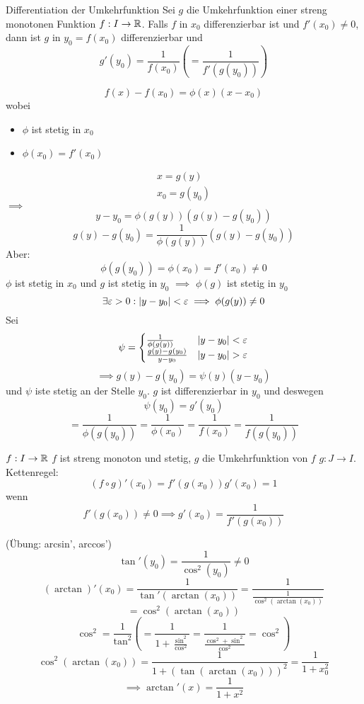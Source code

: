 \begin{Sat}{Differentiation der Umkehrfunktion}
  Sei $g$ die Umkehrfunktion einer streng monotonen Funktion $f:I\to\mathbb{R}$. Falls $f$ in $x_0$ differenzierbar ist und $f'(x_0)\neq 0$, dann ist $g$ in $y_0 = f(x_0)$ differenzierbar und
  \[g'(y_0)=\frac{1}{f(x_0)}\left( =\frac{1}{f'(g(y_0))} \right)\]
\end{Sat}
\begin{Bew}
  \[f(x)-f(x_0)=\phi(x)(x-x_0)\]
  wobei
  \begin{itemize}
    \item $\phi$ ist stetig in $x_0$
    \item $\phi(x_0) = f'(x_0)$
  \end{itemize}
  \begin{eqnarray*}
    x=g(y)\\
    x_0=g(y_0)
  \end{eqnarray*}
  $\implies$
  \[y-y_0=\phi(g(y))(g(y)-g(y_0))\]
  \[g(y)-g(y_0)=\frac{1}{\phi(g(y))}(g(y)-g(y_0))\]
  Aber:
  \[\phi(g(y_0))=\phi(x_0)=f'(x_0)\neq 0\]
  $\phi$ ist stetig in $x_0$ und $g$ ist stetig in $y_0$ $\implies$ $\phi(g)$ ist stetig in $y_0$
  \[\exists\varepsilon>0: \mathopen| y-y_0 \mathclose|<\varepsilon\implies \phi(g(y))\neq 0\]
  Sei
  \[\psi = \begin{cases}
    \frac{1}{\phi(g(y))}&\abs{y-y_0}<\varepsilon\\
    \frac{g(y)-g(y_0)}{y-y_0}&\abs{y-y_0}>\varepsilon
  \end{cases}\]
  \[\implies g(y)-g(y_0)=\psi(y)(y-y_0)\]
  und $\psi$ iste stetig an der Stelle $y_0$. $g$ ist differenzierbar in $y_0$ und deswegen
  \[\psi(y_0)=g'(y_0)\]
  \[=\frac{1}{\phi(g(y_0))}=\frac{1}{\phi(x_0)}=\frac{1}{f(x_0)}=\frac{1}{f(g(y_0))}\]
\end{Bew}
\begin{Bem}
  $f:I\to\mathbb{R}$ $f$ ist streng monoton und stetig, $g$ die Umkehrfunktion von $f$ $g:J\to I$.
  Kettenregel:
  \[(f\circ g)'(x_0)=f'(g(x_0))g'(x_0)=1\]
  wenn
  \[f'(g(x_0))\neq 0\implies g'(x_0)=\frac{1}{f'(g(x_0))}\]
\end{Bem}
\begin{Bsp}
  (Übung: arcsin', arccos')
  \[\tan'(y_0)=\frac{1}{\cos^2(y_0)}\neq 0\]
  \[(\arctan)'(x_0)=\frac{1}{\tan'(\arctan(x_0))}=\frac{1}{\frac{1}{\cos^2(\arctan(x_0))}}\]
  \[=\cos^2(\arctan(x_0))\]
  \[\cos^2=\frac{1}{\tan^2}\left( =\frac{1}{1+\frac{\sin^2}{\cos^2}}=\frac{1}{\frac{\cos^2+\sin^2}{\cos^2}}=\cos^2 \right)\]
  \[\cos^2(\arctan(x_0))=\frac{1}{1+(\tan(\arctan(x_0)))^2}=\frac{1}{1+x_0^2}\]
  \[\implies \arctan'(x)=\frac{1}{1+x^2}\]
\end{Bsp}
